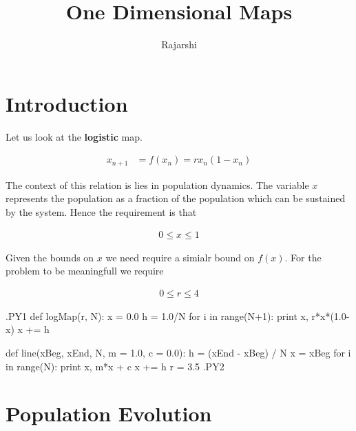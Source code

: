 \documentclass{article}
\begin{document}
\title{One Dimensional Maps}	
\author{Rajarshi}

\maketitle

\section{Introduction}
Let us look at the {\bf logistic} map.

\begin{align*}
	x_{n+1} &= f(x_n) = rx_n(1 - x_n)
\end{align*}

The context of this relation is lies in population dynamics.
The variable $x$ represents the population
as a fraction of the population
which can be sustained by the system.
Hence the requirement is that

\begin{align*}
	0 \leq x \leq 1
\end{align*}

Given the bounds on $x$ we need require a simialr bound on $f(x)$.
For the problem to be meaningfull we require

\begin{align*}
	0 \leq r \leq 4
\end{align*}

.PY1
def logMap(r, N):
	x = 0.0
	h = 1.0/N
	for i in range(N+1):
		print x, r*x*(1.0-x)
		x += h

def line(xBeg, xEnd, N, m = 1.0, c = 0.0):
	h = (xEnd - xBeg) / N
	x = xBeg
	for i in range(N):
		print x, m*x + c
		x += h
r = 3.5
.PY2

\begin{center}
\end{center}

\section{Population Evolution}
\end{document}
